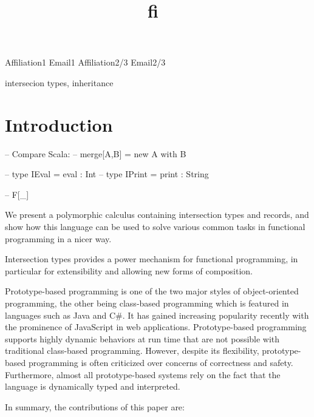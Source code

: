 \documentclass[preprint]{sigplanconf}
\newcommand{\systemfi}{{\bf fi~}}
\begin{document}
\setlength{\pdfpageheight}{\paperheight}
\setlength{\pdfpagewidth}{\paperwidth}

\title{\systemfi}

           {Affiliation1}
           {Email1}
           {Affiliation2/3}
           {Email2/3}

\maketitle

\begin{abstract}
\end{abstract}

\keywords
intersecion types, inheritance
\section{Introduction}

-- Compare Scala:
-- merge[A,B] = new A with B

-- type IEval  = { eval :  Int }
-- type IPrint = { print : String }

-- F[\_]

We present a polymorphic calculus containing intersection types and records, and show
how this language can be used to solve various common tasks in functional
programming in a nicer way.

Intersection types provides a power mechanism for functional programming, in
particular for extensibility and allowing new forms of composition.

Prototype-based programming is one of the two major styles of object-oriented
programming, the other being class-based programming which is featured in
languages such as Java and C\#. It has gained increasing popularity recently
with the prominence of JavaScript in web applications. Prototype-based
programming supports highly dynamic behaviors at run time that are not possible
with traditional class-based programming. However, despite its flexibility,
prototype-based programming is often criticized over concerns of correctness and
safety. Furthermore, almost all prototype-based systems rely on the fact that
the language is dynamically typed and interpreted.

In summary, the contributions of this paper are:
\end{document}

